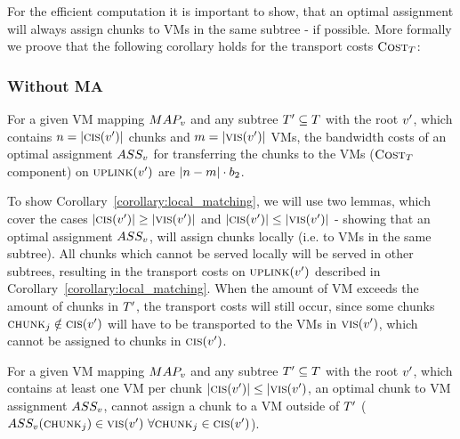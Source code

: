 For the efficient computation it is 
important to show, that an optimal assignment will always assign chunks to VMs 
in the same subtree - if possible. More formally we proove that the following 
corollary holds for the transport costs $\textsc{Cost}_T$:  

\subsubsection{Without MA}

\begin{corollary}
\label{corollary:local_matching}
For a given VM mapping $MAP_v$ and any subtree $T' \subseteq 
T$ with the root $v'$, which contains $n = 
|\textsc{cis}(v')|$ chunks and $m = |\textsc{vis}(v')|$ 
VMs, the bandwidth costs of an optimal assignment $ASS_v$ for 
transferring the chunks to the VMs ($\textsc{Cost}_T$ 
component) on $\textsc{uplink}(v')$ are $|n 
- m| \cdot b_2$.
\end{corollary}

To show Corollary~\ref{corollary:local_matching}, we will use two lemmas, which 
cover the cases $|\textsc{cis}(v')| \geq 
|\textsc{vis}(v')|$ and $|\textsc{cis}(v')| \leq 
|\textsc{vis}(v')|$ - showing that an optimal assignment 
$ASS_v$, will assign chunks locally (i.e. to VMs in the 
same subtree). All chunks which cannot be served locally will be served in 
other subtrees, resulting in the transport costs on $\textsc{uplink}(v')$ 
described in Corollary~\ref{corollary:local_matching}. When the amount of VM 
exceeds the amount of chunks in $T'$, the transport costs will still occur, 
since some chunks $\textsc{chunk}_j \notin \textsc{cis}(v')$ will have to 
be transported to the VMs in $\textsc{vis}(v')$, which cannot be 
assigned to chunks in $\textsc{cis}(v')$.

\begin{lemma}
\label{lemma:matching1}
For a given VM mapping $MAP_v$ and any subtree $T' \subseteq 
T$ with the root $v'$, which contains at least one VM per 
chunk $|\textsc{cis}(v')| \leq |\textsc{vis}(v')$, an 
optimal chunk to VM assignment $ASS_v$, cannot assign a chunk 
to a VM outside of $T'$ ($ASS_v(\textsc{chunk}_j) \in 
\textsc{vis}(v')~ \forall \textsc{chunk}_j \in \textsc{cis}(v')$).
\end{lemma}


